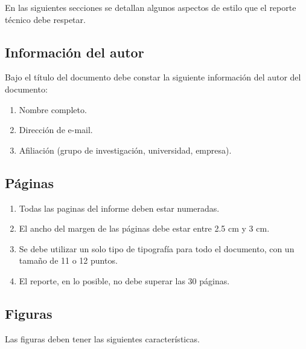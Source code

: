 \documentclass{article}
\begin{document}
En las siguientes secciones se detallan algunos aspectos de estilo que el reporte técnico debe respetar.

\subsection{Información del autor}
\label{sec:autores}

Bajo el título del documento debe constar la siguiente información del autor del documento:

\begin{enumerate}
 \item Nombre completo.
 \item Dirección de e-mail.
 \item Afiliación (grupo de investigación, universidad, empresa).
\end{enumerate}

\subsection{Páginas}
\label{sec:paginas}

\begin{enumerate}

    \item Todas las paginas del informe deben estar numeradas.

    \item El ancho del margen de las páginas debe estar entre 2.5 cm y 3 cm.

    \item Se debe utilizar un solo tipo de tipografía para todo el documento, con un tamaño de 11 o 12 puntos.

    \item El reporte, en lo posible, no debe superar las 30 páginas.

\end{enumerate}

\subsection{Figuras}
\label{sec:figuras}

Las figuras deben tener las siguientes características.
\end{document}
